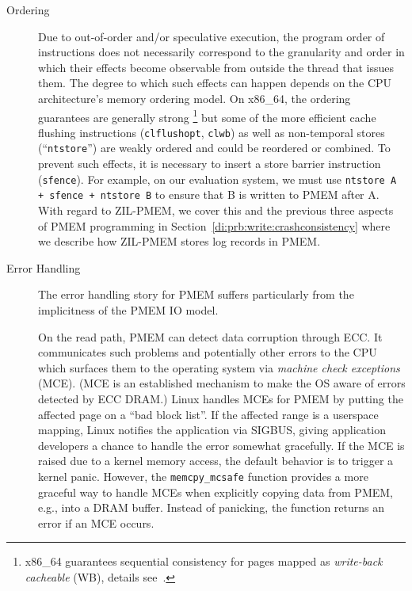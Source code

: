 \documentclass[12pt,a4paper,twoside]{book}
\begin{document}
\begin{description}
    \item[Ordering]
        Due to out-of-order and/or speculative execution, the program order of instructions does not necessarily correspond to the granularity and order in which their effects become observable from outside the thread that issues them.
        The degree to which such effects can happen depends on the CPU architecture's memory ordering model.
        On x86\_64, the ordering guarantees are generally strong%
        \footnote{x86\_64 guarantees sequential consistency for pages mapped as \textit{write-back cacheable} (WB), details see~\cite{braisSignificanceX86SFENCE2019}.}
        but some of the more efficient cache flushing instructions (\lstinline{clflushopt}, \lstinline{clwb}) as well as non-temporal stores (``\lstinline{ntstore}'') are weakly ordered and could be reordered or combined.
        To prevent such effects, it is necessary to insert a store barrier instruction (\lstinline{sfence}).
        For example, on our evaluation system, we must use \lstinline{ntstore A + sfence + ntstore B} to ensure that B is written to PMEM after A.
        With regard to ZIL-PMEM, we cover this and the previous three aspects of PMEM programming in Section~\ref{di:prb:write:crashconsistency} where we describe how ZIL-PMEM stores log records in PMEM.~\cite{rudoffPersistentMemoryProgramming2017,braisSignificanceX86SFENCE2019}

    \item[Error Handling] The error handling story for PMEM suffers particularly from the implicitness of the PMEM IO model.

        On the read path, PMEM can detect data corruption through ECC.
        It communicates such problems and potentially other errors to the CPU which surfaces them to the operating system via \textit{machine check exceptions} (MCE).
        (MCE is an established mechanism to make the OS aware of errors detected by ECC DRAM.)
        Linux handles MCEs for PMEM by putting the affected page on a ``bad block list''.
        If the affected range is a userspace mapping, Linux notifies the application via SIGBUS, giving application developers a chance to handle the error somewhat gracefully.
        If the MCE is raised due to a kernel memory access, the default behavior is to trigger a kernel panic.
        However, the \lstinline{memcpy_mcsafe} function provides a more graceful way to handle MCEs when explicitly copying data from PMEM, e.g., into a DRAM buffer.
        Instead of panicking, the function returns an error if an MCE occurs.~\cite{ReliabilityAvailabilityServiceability,PersistentmemoryErrorHandling,Scargall2020,xuNOVAFortisFaulttolerantNonvolatile2017}


\end{description}
\end{document}
